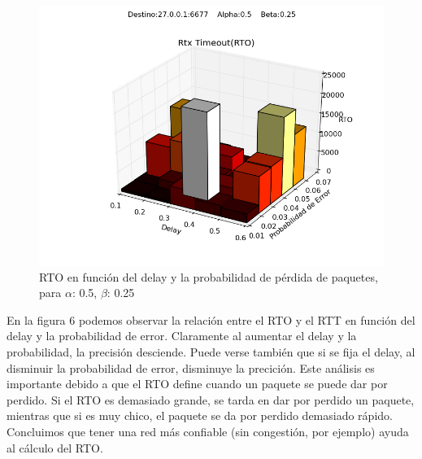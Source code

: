 \begin{figure}[H]
  \centering	
	\includegraphics[scale=0.5]{../analisis/graficos_tablas/graficos_en_funcion_de_delay_probaerror/0.5-0.25_2/rto.png}
  \caption{RTO en función del delay y la probabilidad de pérdida de paquetes, para $\alpha$: 0.5, $\beta$: 0.25}
	\label{fig:histo-src-sitiotrabajo}
\end{figure}

En la figura $6$ podemos observar la relación entre el RTO y el RTT en función del delay y la probabilidad de error. Claramente al aumentar el delay y la probabilidad, la precisión desciende. Puede verse también que si se fija el delay, al disminuir la probabilidad de error, disminuye la precición. Este análisis es importante debido a que el RTO define cuando un paquete se puede dar por perdido. Si el RTO es demasiado grande, se tarda en dar por perdido un paquete, mientras que si es muy chico, el paquete se da por perdido demasiado rápido. Concluimos que tener una red más confiable (sin congestión, por ejemplo) ayuda al cálculo del RTO.

